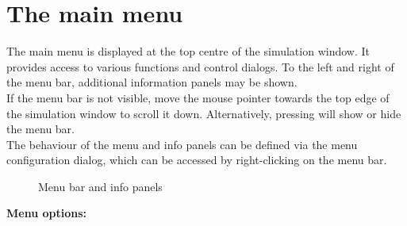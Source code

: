 \documentclass[Orbiter User Manual.tex]{subfiles}
\begin{document}
\section{The main menu}
\label{sec:menu}
The main menu is displayed at the top centre of the simulation window. It provides access to various functions and control dialogs. To the left and right of the menu bar, additional information panels may be shown.\\
If the menu bar is not visible, move the mouse pointer towards the top edge of the simulation window to scroll it down. Alternatively, pressing  will show or hide the menu bar.\\
The behaviour of the menu and info panels can be defined via the menu configuration dialog, which can be accessed by right-clicking on the menu bar.

\begin{figure}[H]
	\centering
	\caption{Menu bar and info panels}
\end{figure}

\noindent
\textbf{Menu options:}
\end{document}

